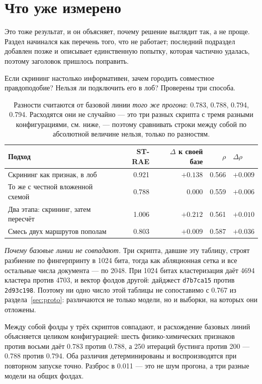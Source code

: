 \section{Что уже измерено}
\label{sec:neg}

Это тоже результат, и он объясняет, почему решение выглядит так, а не проще. Раздел начинался как
перечень того, что не работает; последний подраздел добавлен позже и описывает единственную попытку,
которая частично удалась, поэтому заголовок пришлось поправить.

Если скрининг настолько информативен, зачем городить совместное правдоподобие? Нельзя ли подключить
его в лоб? Проверены три способа.

\begin{table}[htbp]\centering\small
\begin{tabularx}{\textwidth}{@{}Xrrrl@{}}
\toprule
Подход & ST-RAE & $\Delta$ к своей базе & $\rho$ & $\Delta\rho$ \\
\midrule
Скрининг как признак, в лоб & 0.921 & $+0.138$ & 0.566 & $+0.009$ \\
То же с честной вложенной схемой & 0.788 & $0.000$ & 0.559 & $+0.006$ \\
Два этапа: скрининг, затем пересчёт & 1.006 & $+0.212$ & 0.561 & $+0.010$ \\
Смесь двух маршрутов пополам & 0.803 & $+0.009$ & 0.587 & $+0.036$ \\
\bottomrule
\end{tabularx}
\caption{Разности считаются от базовой линии \emph{того же прогона}: 0.783, 0.788, 0.794, 0.794.
Расходятся они не случайно --- это три разных скрипта с тремя разными конфигурациями, см. ниже, ---
поэтому сравнивать строки между собой по абсолютной величине нельзя, только по разностям.}
\label{tab:neg}
\end{table}

\emph{Почему базовые линии не совпадают.} Три скрипта, давшие эту таблицу, строят разбиение по
фингерпринту в 1024 бита, тогда как абляционная сетка и все остальные числа документа --- по 2048.
При 1024 битах кластеризация даёт 4694 кластера против 4703, и вектор фолдов другой: дайджест
\texttt{d7b7ca15} против \texttt{2d93c198}. Поэтому ни одно число этой таблицы не сопоставимо
с 0.767 из раздела~\ref{sec:proto}: различаются не только модели, но и выборки, на которых
они отложены.

Между собой фолды у трёх скриптов совпадают, и расхождение базовых линий объясняется целиком
конфигурацией: шесть физико-химических признаков против восьми даёт 0.783 против 0.788, а
250 итераций бустинга против 200 --- 0.788 против 0.794. Оба различия детерминированы и
воспроизводятся при повторном запуске точно. Разброс в 0.011 --- это не шум прогона, а три
разные модели на общих фолдах.

